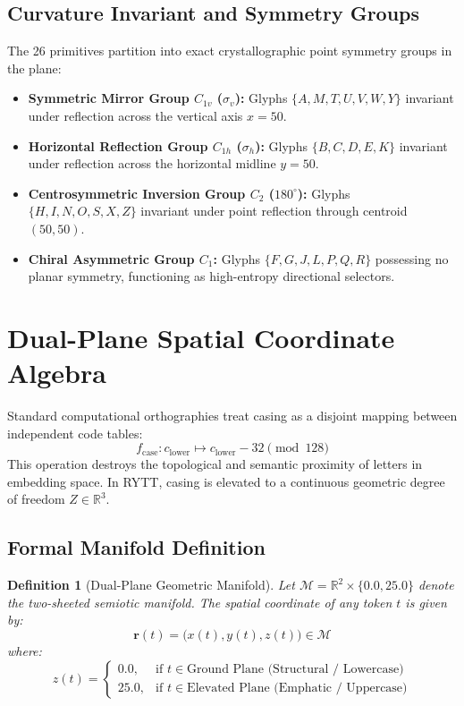 \documentclass[11pt,oneside,letterpaper]{article}
\theoremstyle{sovereignstyle}
\newtheorem{definition}{Definition}[section]
\begin{document}
\subsection{Curvature Invariant and Symmetry Groups}
The 26 primitives partition into exact crystallographic point symmetry groups in the plane:
\begin{itemize}
  \item \textbf{Symmetric Mirror Group $C_{1v}$ ($\sigma_v$):} Glyphs $\{A, M, T, U, V, W, Y\}$ invariant under reflection across the vertical axis $x = 50$.
  \item \textbf{Horizontal Reflection Group $C_{1h}$ ($\sigma_h$):} Glyphs $\{B, C, D, E, K\}$ invariant under reflection across the horizontal midline $y = 50$.
  \item \textbf{Centrosymmetric Inversion Group $C_2$ ($180^\circ$):} Glyphs $\{H, I, N, O, S, X, Z\}$ invariant under point reflection through centroid $(50, 50)$.
  \item \textbf{Chiral Asymmetric Group $C_1$:} Glyphs $\{F, G, J, L, P, Q, R\}$ possessing no planar symmetry, functioning as high-entropy directional selectors.
\end{itemize}

\section{Dual-Plane Spatial Coordinate Algebra}

Standard computational orthographies treat casing as a disjoint mapping between independent code tables:
\begin{equation}
f_{\text{case}}: c_{\text{lower}} \mapsto c_{\text{lower}} - 32 \pmod{128}
\end{equation}
This operation destroys the topological and semantic proximity of letters in embedding space. In RYTT, casing is elevated to a continuous geometric degree of freedom $Z \in \mathbb{R}^3$.

\subsection{Formal Manifold Definition}
\begin{definition}[Dual-Plane Geometric Manifold]
Let $\mathcal{M} = \mathbb{R}^2 \times \{0.0, 25.0\}$ denote the two-sheeted semiotic manifold. The spatial coordinate of any token $t$ is given by:
\begin{equation}
\mathbf{r}(t) = \big(x(t), y(t), z(t)\big) \in \mathcal{M}
\end{equation}
where:
\begin{equation}
z(t) = \begin{cases}
0.0, & \text{if } t \in \text{Ground Plane (Structural / Lowercase)} \\
25.0, & \text{if } t \in \text{Elevated Plane (Emphatic / Uppercase)}
\end{cases}
\end{equation}
\end{definition}
\end{document}
